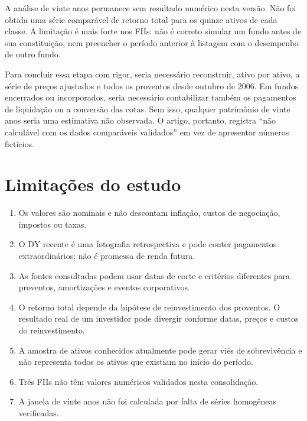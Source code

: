 \documentclass[11pt,a4paper]{article}
\begin{document}
A análise de vinte anos permanece sem resultado numérico nesta versão. Não foi obtida uma série comparável de retorno total para os quinze ativos de cada classe. A limitação é mais forte nos FIIs: não é correto simular um fundo antes de sua constituição, nem preencher o período anterior à listagem com o desempenho de outro fundo.

Para concluir essa etapa com rigor, seria necessário reconstruir, ativo por ativo, a série de preços ajustados e todos os proventos desde outubro de 2006. Em fundos encerrados ou incorporados, seria necessário contabilizar também os pagamentos de liquidação ou a conversão das cotas. Sem isso, qualquer patrimônio de vinte anos seria uma estimativa não observada. O artigo, portanto, registra “não calculável com os dados comparáveis validados” em vez de apresentar números fictícios.

\section{Limitações do estudo}

\begin{enumerate}

\item Os valores são nominais e não descontam inflação, custos de negociação, impostos ou taxas.

\item O DY recente é uma fotografia retrospectiva e pode conter pagamentos extraordinários; não é promessa de renda futura.

\item As fontes consultadas podem usar datas de corte e critérios diferentes para proventos, amortizações e eventos corporativos.

\item O retorno total depende da hipótese de reinvestimento dos proventos. O resultado real de um investidor pode divergir conforme datas, preços e custos do reinvestimento.

\item A amostra de ativos conhecidos atualmente pode gerar viés de sobrevivência e não representa todos os ativos que existiam no início do período.

\item Três FIIs não têm valores numéricos validados nesta consolidação.

\item A janela de vinte anos não foi calculada por falta de séries homogêneas verificadas.

\end{enumerate}
\end{document}
